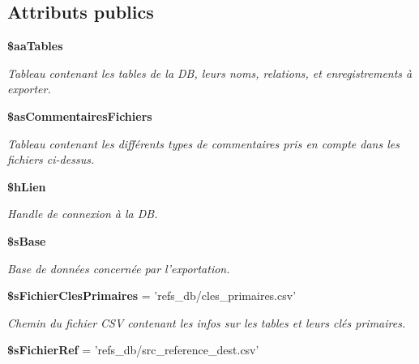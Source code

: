 \subsection*{Attributs publics}
\begin{CompactItemize}
\item 
{\bf \$aaTables}\label{class_c_export_db_c9f44e7a100da302fa70666bcc524896}

\begin{CompactList}\small\item\em Tableau contenant les tables de la DB, leurs noms, relations, et enregistrements à exporter. \item\end{CompactList}\item 
{\bf \$asCommentairesFichiers}\label{class_c_export_db_463244f9577c4d22779bd55135ec53f7}

\begin{CompactList}\small\item\em Tableau contenant les différents types de commentaires pris en compte dans les fichiers ci-dessus. \item\end{CompactList}\item 
{\bf \$hLien}\label{class_c_export_db_5ec79213cea9a0804241016561643341}

\begin{CompactList}\small\item\em Handle de connexion à la DB. \item\end{CompactList}\item 
{\bf \$sBase}\label{class_c_export_db_be58f8ab3ee6f12b76f2afd16e8b07c9}

\begin{CompactList}\small\item\em Base de données concernée par l'exportation. \item\end{CompactList}\item 
{\bf \$sFichierClesPrimaires} = 'refs\_\-db/cles\_\-primaires.csv'\label{class_c_export_db_af35fe3d5c94e9555b696ff29dd07f5d}

\begin{CompactList}\small\item\em Chemin du fichier CSV contenant les infos sur les tables et leurs clés primaires. \item\end{CompactList}\item 
{\bf \$sFichierRef} = 'refs\_\-db/src\_\-reference\_\-dest.csv'\label{class_c_export_db_7f4028e42363d5d93b1945b886ce0d46}


\end{CompactItemize}
